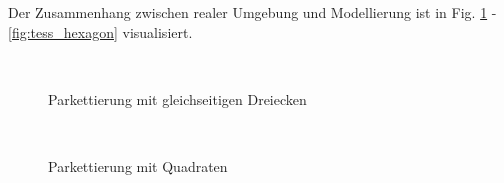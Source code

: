 \documentclass{article}
\begin{document}
Der Zusammenhang zwischen realer Umgebung und Modellierung ist in
Fig. \ref{fig:tess_triangle} - \ref{fig:tess_hexagon} visualisiert.

\begin{figure}[!ht]
  \centering
  \qquad
  \\
  \caption{Parkettierung mit gleichseitigen Dreiecken}
  \label{fig:tess_triangle}
\end{figure}

\begin{figure}[!ht]
  \centering
  \qquad
  \\
  \caption{Parkettierung mit Quadraten}
  \label{fig:tess_square}
\end{figure}
\end{document}
